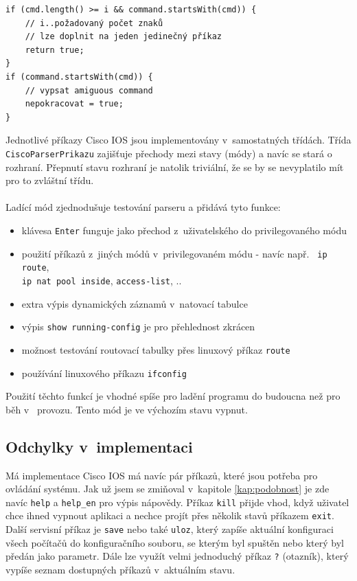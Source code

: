 \begin{verbatim}
if (cmd.length() >= i && command.startsWith(cmd)) {
    // i..požadovaný počet znaků 
    // lze doplnit na jeden jedinečný příkaz
    return true;
}
if (command.startsWith(cmd)) {
    // vypsat amiguous command
    nepokracovat = true;
}
\end{verbatim}

Jednotlivé příkazy Cisco IOS jsou implementovány v~samostatných třídách. Třída \\\verb|CiscoParserPrikazu| zajišťuje přechody mezi stavy (módy) a navíc se stará o  rozhraní. Přepnutí stavu rozhraní je natolik triviální, že se by se nevyplatilo mít pro to zvláštní třídu. 

\paragraph{}
Ladící mód zjednodušuje testování parseru a přidává tyto funkce:
\begin{itemize}
 \item klávesa \verb|Enter| funguje jako přechod z~uživatelského do privilegovaného módu
 \item použití příkazů z~jiných módů v~privilegovaném módu - navíc např. \verb| ip route|, \\\verb|ip nat pool inside|, \verb|access-list|, ..
 \item extra výpis dynamických záznamů v~natovací tabulce
 \item výpis \verb|show running-config| je pro přehlednost zkrácen
 \item možnost testování routovací tabulky přes linuxový příkaz \verb|route|
 \item používání linuxového příkazu \verb|ifconfig|
\end{itemize}
Použití těchto funkcí je vhodné spíše pro ladění programu do budoucna než pro běh v~ provozu. Tento mód je ve výchozím stavu vypnut.


\subsection{Odchylky v~implementaci}
Má implementace Cisco IOS má navíc pár příkazů, které jsou potřeba pro ovládání systému. Jak už jsem se zmiňoval v~kapitole \ref{kap:podobnost} je zde navíc \verb|help| a \verb|help_en| pro výpis nápovědy. Příkaz \verb|kill| přijde vhod, když uživatel chce ihned vypnout aplikaci a nechce projít přes několik stavů příkazem \verb|exit|. Další servisní příkaz je \verb|save| nebo také \verb|uloz|, který zapíše aktuální konfiguraci všech počítačů do konfiguračního souboru, se kterým byl spuštěn nebo který byl předán jako parametr. Dále lze využít velmi jednoduchý příkaz \verb|?| (otazník), který vypíše seznam dostupných příkazů v~aktuálním stavu.

